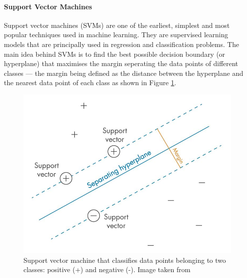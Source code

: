 \documentclass[12pt, a4paper]{article}
\begin{document}

\paragraph{Support Vector Machines}

Support vector machines (SVMs) are one of the earliest, simplest and most popular techniques used in machine learning. They are supervised learning models that are principally used in regression and classification problems. The main idea behind SVMs is to find the best possible decision boundary (or hyperplane) that maximises the margin seperating the data points of different classes --- the margin being defined as the distance between the hyperplane and the nearest data point of each class as shown in Figure \ref{fig:svm}.

\begin{figure}[H]
    \centering
    \includegraphics[scale=0.53]{images/svm.jpg}
    \caption{Support vector machine that classifies data points belonging to two classes: positive (+) and negative (-). Image taken from \cite{svmimage}}
    \label{fig:svm}
\end{figure}
\end{document}
